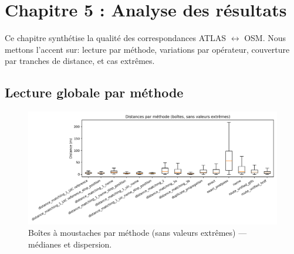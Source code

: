 \chapter{Chapitre 5 : Analyse des résultats}

Ce chapitre synthétise la qualité des correspondances ATLAS $\leftrightarrow$ OSM. Nous mettons l'accent sur: lecture par méthode, variations par opérateur, couverture par tranches de distance, et cas extrêmes.

\section{Lecture globale par méthode}

\begin{figure}[H]
    \centering
    \includegraphics[width=\textwidth]{../figures/chap5/distances_by_method_box.png}
    \caption[Boîtes par méthode]{Boîtes à moustaches par méthode (sans valeurs extrêmes) — médianes et dispersion.}
\end{figure}


